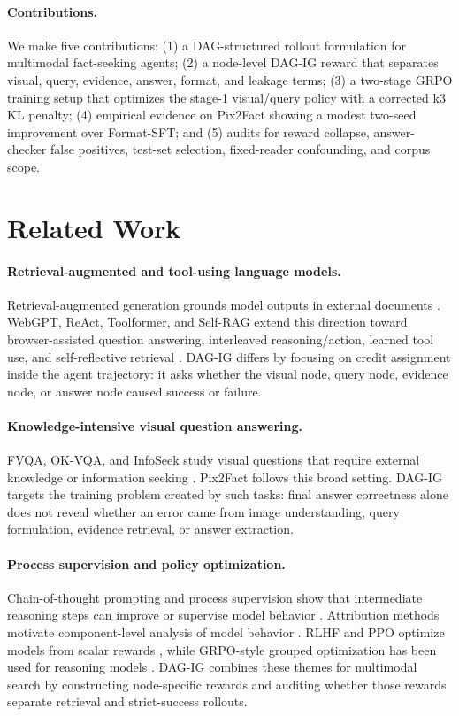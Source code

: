 \documentclass[11pt]{article}
\begin{document}
\paragraph{Contributions.}
We make five contributions: (1) a DAG-structured rollout formulation for multimodal fact-seeking agents; (2) a node-level DAG-IG reward that separates visual, query, evidence, answer, format, and leakage terms; (3) a two-stage GRPO training setup that optimizes the stage-1 visual/query policy with a corrected k3 KL penalty; (4) empirical evidence on Pix2Fact showing a modest two-seed improvement over Format-SFT; and (5) audits for reward collapse, answer-checker false positives, test-set selection, fixed-reader confounding, and corpus scope.

\section{Related Work}

\paragraph{Retrieval-augmented and tool-using language models.}
Retrieval-augmented generation grounds model outputs in external documents \cite{lewis2020rag}. WebGPT, ReAct, Toolformer, and Self-RAG extend this direction toward browser-assisted question answering, interleaved reasoning/action, learned tool use, and self-reflective retrieval \cite{nakano2021webgpt,yao2023react,schick2023toolformer,asai2023selfrag}. DAG-IG differs by focusing on credit assignment inside the agent trajectory: it asks whether the visual node, query node, evidence node, or answer node caused success or failure.

\paragraph{Knowledge-intensive visual question answering.}
FVQA, OK-VQA, and InfoSeek study visual questions that require external knowledge or information seeking \cite{wang2017fvqa,marino2019okvqa,chen2023infoseek}. Pix2Fact follows this broad setting. DAG-IG targets the training problem created by such tasks: final answer correctness alone does not reveal whether an error came from image understanding, query formulation, evidence retrieval, or answer extraction.

\paragraph{Process supervision and policy optimization.}
Chain-of-thought prompting and process supervision show that intermediate reasoning steps can improve or supervise model behavior \cite{wei2022cot,lightman2023process}. Attribution methods motivate component-level analysis of model behavior \cite{sundararajan2017integrated}. RLHF and PPO optimize models from scalar rewards \cite{ouyang2022instructgpt,schulman2017ppo}, while GRPO-style grouped optimization has been used for reasoning models \cite{shao2024deepseekmath}. DAG-IG combines these themes for multimodal search by constructing node-specific rewards and auditing whether those rewards separate retrieval and strict-success rollouts.
\end{document}
